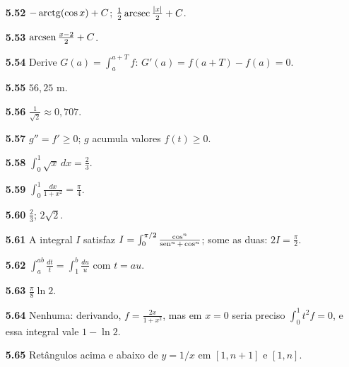 {\begin{multicols}{2}
\begin{itemize}[leftmargin=2.7em,labelsep=0.5em,itemsep=1pt]
\item[\textbf{5.52}] $-\operatorname{arctg}(\cos x)+C$; $\tfrac12\operatorname{arcsec}\tfrac{|x|}2+C$.
\item[\textbf{5.53}] $\operatorname{arcsen}\tfrac{x-2}2+C$.
\item[\textbf{5.54}] Derive $G(a)=\int_a^{a+T}f$: $G'(a)=f(a+T)-f(a)=0$.
\item[\textbf{5.55}] $56{,}25$ m.
\item[\textbf{5.56}] $\tfrac1{\sqrt2}\approx0{,}707$.
\item[\textbf{5.57}] $g''=f'\ge0$; $g$ acumula valores $f(t)\ge0$.
\item[\textbf{5.58}] $\int_0^1\sqrt x\,dx=\tfrac23$.
\item[\textbf{5.59}] $\int_0^1\tfrac{dx}{1+x^2}=\tfrac\pi4$.
\item[\textbf{5.60}] $\tfrac23$; $2\sqrt2$.
\item[\textbf{5.61}] A integral $I$ satisfaz $I=\int_0^{\pi/2}\tfrac{\cos^n}{\operatorname{sen}^n+\cos^n}$; some as duas: $2I=\tfrac\pi2$.
\item[\textbf{5.62}] $\int_a^{ab}\tfrac{dt}t=\int_1^b\tfrac{du}u$ com $t=au$.
\item[\textbf{5.63}] $\tfrac\pi8\ln2$.
\item[\textbf{5.64}] Nenhuma: derivando, $f=\tfrac{2x}{1+x^2}$, mas em $x=0$ seria preciso $\int_0^1t^2f=0$, e essa integral vale $1-\ln2$.
\item[\textbf{5.65}] Retângulos acima e abaixo de $y=1/x$ em $[1,n+1]$ e $[1,n]$.
\end{itemize}\end{multicols}}
